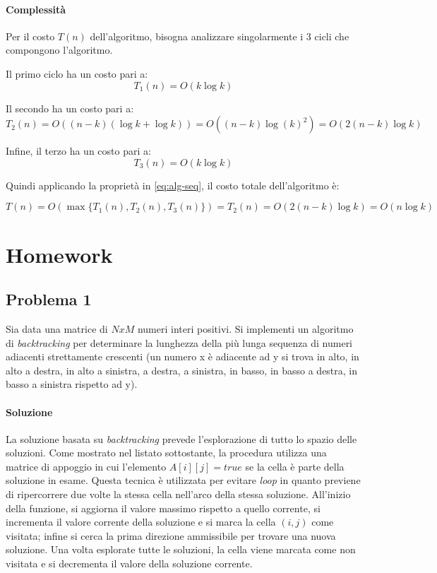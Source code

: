\documentclass{article}
\begin{document}
\paragraph{Complessità}
Per il costo $T(n)$ dell'algoritmo, bisogna analizzare singolarmente i $3$ cicli che compongono l'algoritmo.

Il primo ciclo ha un costo pari a:
\begin{equation*}
    T_1(n) = O(k \log k)
\end{equation*}

Il secondo ha un costo pari a:
\begin{equation*}
    T_2(n) = O((n-k)(\log k + \log k)) = O((n-k)\log (k)^2) = O(2(n-k)\log k)
\end{equation*}

Infine, il terzo ha un costo pari a:
\begin{equation*}
    T_3(n) = O(k\log k)
\end{equation*}

Quindi applicando la proprietà in \cref{eq:alg-seq}, il costo totale dell'algoritmo è:

\begin{equation*}
    T(n) = O(\max\{T_1(n), T_2(n), T_3(n)\}) = T_2(n) =  O(2(n-k) \log k) = O(n \log k)
\end{equation*}

\clearpage

\section{Homework}
\subsection{Problema 1}
Sia data una matrice di $N x M$ numeri interi positivi. Si implementi un algoritmo di
\textit{backtracking} per determinare la lunghezza della più lunga sequenza di numeri adiacenti strettamente crescenti (un numero x è adiacente ad y si trova in alto, in alto a destra, in alto a sinistra, a destra, a sinistra, in basso, in basso a destra, in basso a sinistra rispetto ad y).

\paragraph{Soluzione} La soluzione basata su \textit{backtracking} prevede l'esplorazione di tutto lo spazio delle soluzioni. Come mostrato nel listato sottostante, la procedura utilizza una matrice di appoggio in cui l'elemento $A[i][j]=true$ se la cella è parte della soluzione in esame. Questa tecnica è utilizzata per evitare \textit{loop} in quanto previene di ripercorrere due volte la stessa cella nell'arco della stessa soluzione.
All'inizio della funzione, si aggiorna il valore massimo rispetto a quello corrente, si incrementa il valore corrente della soluzione e si marca la cella $(i,j)$ come visitata; infine si cerca la prima direzione ammissibile per trovare una nuova soluzione. Una volta esplorate tutte le soluzioni, la cella viene marcata come non visitata e si decrementa il valore della soluzione corrente.
\end{document}
